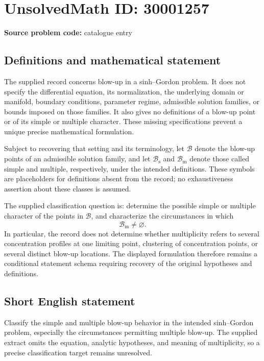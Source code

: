 \documentclass[11pt]{article}
\begin{document}
\section*{UnsolvedMath ID: 30001257}
\textbf{Source problem code:} catalogue entry
\subsection{Definitions and mathematical statement}
The supplied record concerns blow-up in a sinh--Gordon problem. It does not specify the differential equation, its normalization, the underlying domain or manifold, boundary conditions, parameter regime, admissible solution families, or bounds imposed on those families. It also gives no definitions of a blow-up point or of its simple or multiple character. These missing specifications prevent a unique precise mathematical formulation.

Subject to recovering that setting and its terminology, let \(\mathcal B\) denote the blow-up points of an admissible solution family, and let \(\mathcal B_{\mathrm{s}}\) and \(\mathcal B_{\mathrm{m}}\) denote those called simple and multiple, respectively, under the intended definitions. These symbols are placeholders for definitions absent from the record; no exhaustiveness assertion about these classes is assumed.

The supplied classification question is: determine the possible simple or multiple character of the points in \(\mathcal B\), and characterize the circumstances in which
\[
\mathcal B_{\mathrm{m}}\ne\varnothing.
\]
In particular, the record does not determine whether multiplicity refers to several concentration profiles at one limiting point, clustering of concentration points, or several distinct blow-up locations. The displayed formulation therefore remains a conditional statement schema requiring recovery of the original hypotheses and definitions.
\subsection{Short English statement}
Classify the simple and multiple blow-up behavior in the intended sinh--Gordon problem, especially the circumstances permitting multiple blow-up. The supplied extract omits the equation, analytic hypotheses, and meaning of multiplicity, so a precise classification target remains unresolved.
\end{document}

